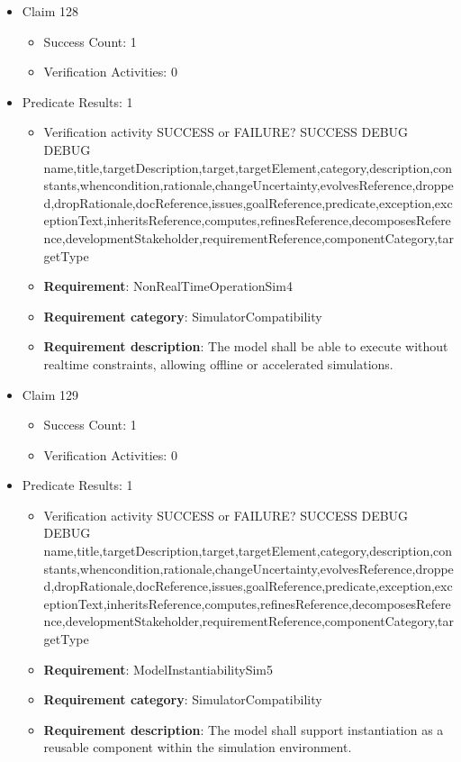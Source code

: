 \documentclass{article}
\begin{document}
\begin{itemize}
  				  \item Claim 128
				\begin{itemize}
			    	\item Success Count: 1 
			    	\item Verification Activities: 0
				\end{itemize}
				
									    
				\item Predicate Results: 1
					\begin{itemize}				
					\item Verification activity SUCCESS or FAILURE? SUCCESS
					DEBUG DEBUG name,title,targetDescription,target,targetElement,category,description,constants,whencondition,rationale,changeUncertainty,evolvesReference,dropped,dropRationale,docReference,issues,goalReference,predicate,exception,exceptionText,inheritsReference,computes,refinesReference,decomposesReference,developmentStakeholder,requirementReference,componentCategory,targetType
					\item \textbf{Requirement}: NonRealTimeOperationSim4 
					\item \textbf{Requirement category}: SimulatorCompatibility
					\item \textbf{Requirement description}: The model shall be able to execute without realtime constraints, allowing offline or accelerated simulations.
					\end{itemize}

  				  \item Claim 129
				\begin{itemize}
			    	\item Success Count: 1 
			    	\item Verification Activities: 0
				\end{itemize}
				
									    
				\item Predicate Results: 1
					\begin{itemize}				
					\item Verification activity SUCCESS or FAILURE? SUCCESS
					DEBUG DEBUG name,title,targetDescription,target,targetElement,category,description,constants,whencondition,rationale,changeUncertainty,evolvesReference,dropped,dropRationale,docReference,issues,goalReference,predicate,exception,exceptionText,inheritsReference,computes,refinesReference,decomposesReference,developmentStakeholder,requirementReference,componentCategory,targetType
					\item \textbf{Requirement}: ModelInstantiabilitySim5 
					\item \textbf{Requirement category}: SimulatorCompatibility
					\item \textbf{Requirement description}: The model shall support instantiation as a reusable component within the simulation environment.
					\end{itemize}


\end{itemize}
\end{document}
